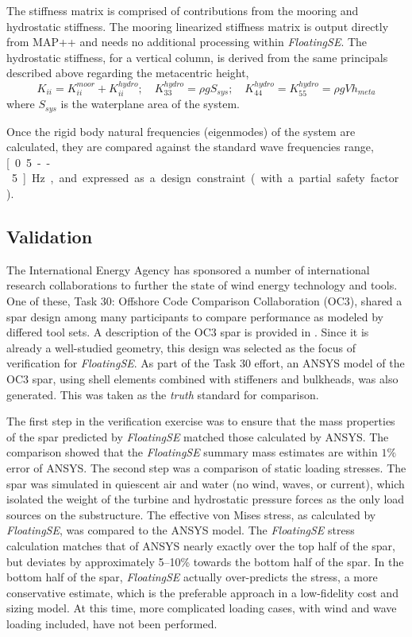 The stiffness matrix is comprised of contributions from the mooring
and hydrostatic stiffness.  The mooring linearized stiffness matrix is output
directly from MAP++ and needs no additional processing within
\textit{FloatingSE}.  The hydrostatic stiffness, for a vertical column, is derived from the same
principals described above regarding the metacentric height,
\begin{equation}
  K_{ii} = K_{ii}^{moor} + K_{ii}^{hydro};\quad K_{33}^{hydro} = \rho g
  S_{sys};\quad K_{44}^{hydro} =  K_{55}^{hydro} = \rho g V h_{meta}
\end{equation}
where $S_{sys}$ is the waterplane area of the system.

Once the rigid body natural frequencies (eigenmodes) of the system are
calculated, they are compared against the standard wave frequencies
range, \unit[0.5--5]{Hz}, and expressed as a design constraint (with a
partial safety factor).


\subsection{Validation}
The International Energy Agency has sponsored a number of international
research collaborations to further the state of wind energy technology and
tools.  One of these, Task 30: Offshore Code Comparison Collaboration
(OC3), shared a spar design among many participants to compare
performance as modeled by differed tool sets.  A description of the OC3
spar is provided in \citet{OC3}.  Since it is already a
well-studied geometry, this design was selected as the focus of
verification for \textit{FloatingSE}.  As part of the Task 30 effort,
an ANSYS model of the OC3 spar, using shell elements combined with
stiffeners and bulkheads, was also generated.  This was taken as
the \textit{truth} standard for comparison.

The first step in the verification exercise was to ensure that the mass
properties of the spar predicted by \textit{FloatingSE} matched those
calculated by ANSYS.  The comparison showed that the \textit{FloatingSE}
summary mass estimates are within $1\%$ error of ANSYS.  The second step
was a comparison of static loading stresses.  The spar was simulated in
quiescent air and water (no wind, waves, or current), which isolated the
weight of the turbine and hydrostatic pressure forces as the only load
sources on the substructure.  The effective von Mises stress, as
calculated by \textit{FloatingSE}, was compared to the ANSYS model.  The
\textit{FloatingSE} stress calculation matches that of ANSYS nearly
exactly over the top half of the spar, but deviates by approximately
5--10\% towards the bottom half of the spar.  In the bottom half of the
spar, \textit{FloatingSE} actually over-predicts the stress, a more
conservative estimate, which is the preferable approach in a
low-fidelity cost and sizing model.  At this time, more complicated
loading cases, with wind and wave loading included, have not been
performed.

